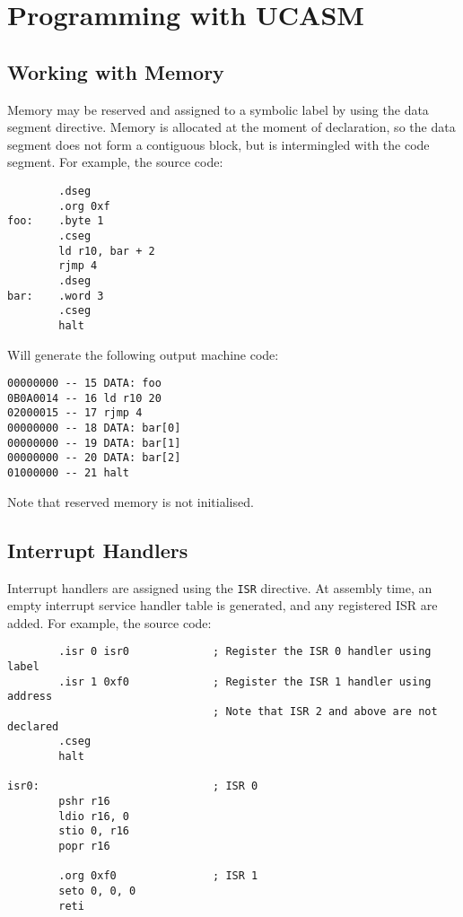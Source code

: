\documentclass[12pt,twoside]{report}
\begin{document}
\chapter{Programming with UCASM}

\section{Working with Memory}

Memory may be reserved and assigned to a symbolic label by using the
data segment directive. Memory is allocated at the moment of
declaration, so the data segment does not form a contiguous block, but
is intermingled with the code segment. For example, the source code:

\begin{verbatim}
        .dseg
        .org 0xf
foo:    .byte 1
        .cseg
        ld r10, bar + 2
        rjmp 4
        .dseg
bar:    .word 3
        .cseg
        halt
\end{verbatim}

Will generate the following output machine code:

\begin{verbatim}
00000000 -- 15 DATA: foo
0B0A0014 -- 16 ld r10 20
02000015 -- 17 rjmp 4
00000000 -- 18 DATA: bar[0]
00000000 -- 19 DATA: bar[1]
00000000 -- 20 DATA: bar[2]
01000000 -- 21 halt
\end{verbatim}

Note that reserved memory is not initialised.

\section{Interrupt Handlers}

Interrupt handlers are assigned using the \texttt{ISR} directive. At
assembly time, an empty interrupt service handler table is generated,
and any registered ISR are added. For example, the source code:

\begin{verbatim}
        .isr 0 isr0             ; Register the ISR 0 handler using label
        .isr 1 0xf0             ; Register the ISR 1 handler using address
                                ; Note that ISR 2 and above are not declared
        .cseg
        halt

isr0:                           ; ISR 0
        pshr r16
        ldio r16, 0
        stio 0, r16
        popr r16

        .org 0xf0               ; ISR 1
        seto 0, 0, 0
        reti
\end{verbatim}
\end{document}
